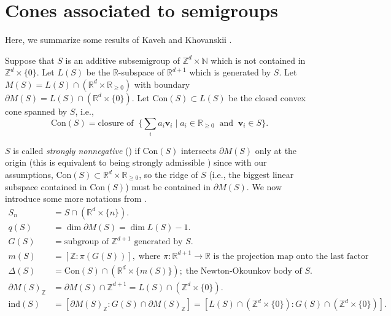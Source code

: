 \documentclass[12pt,a4paper]{amsart}
\theoremstyle{plain}
\theoremstyle{definition}
\numberwithin{equation}{theorem}
\begin{document}
\section{Cones associated to semigroups}\label{cones}

Here, we summarize some results of Kaveh and Khovanskii \cite{KK12}.

Suppose that $S$ is an additive subsemigroup of $\mathbb{Z}^d\times \mathbb{N}$ which is not contained in $\mathbb{Z}^d\times \{0\}$. Let $L(S)$ be the $\mathbb{R}$-subspace of $\mathbb{R}^{d+1}$ which is generated by $S$. Let $M(S) = L(S)\cap \left(\mathbb{R}^d\times \mathbb{R}_{\geq 0}\right)$ with boundary $\partial M(S) = L(S)\cap \left(\mathbb{R}^d\times \{0\}\right)$. Let $\mathrm{Con}(S) \subset L(S)$ be the closed convex cone spanned by $S$, i.e., $$\mathrm{Con}(S) = \text{closure of}\;\;\Big\{\sum_{i}a_i\mathbf{v}_i \mid a_i\in\mathbb{R}_{\geq 0}\;\;\text{and}\;\;\mathbf{v}_i\in S\Big\}.$$

$S$ is called \emph{strongly nonnegative} (\cite[Section 1.4]{KK12}) if $\mathrm{Con}(S)$ intersects $\partial M(S)$ only at the origin (this is equivalent to being strongly admissible \cite[Definition 1.9]{KK12}) since with our assumptions, $\mathrm{Con}(S) \subset \mathbb{R}^d\times \mathbb{R}_{\geq 0}$, so the ridge of $S$ (i.e., the biggest linear subspace contained in $\mathrm{Con}(S)$) must be contained in $\partial M(S)$. We now introduce some more notations from \cite[Section 1.4]{KK12}.
\begin{align*}
 S_n &= S \cap \left(\mathbb{R}^d\times \{n\}\right).\\
 q(S) &= \dim \partial M(S) = \dim L(S)-1.\\
 G(S) &= \text{subgroup of $\mathbb{Z}^{d+1}$ generated by $S$}.\\
 m(S) &= \left[\mathbb{Z} \colon \pi(G(S))\right],\;\text{where $\pi\colon \mathbb{R}^{d+1}\to \mathbb{R}$ is the projection map onto the last factor}\\
 \Delta(S) &= \mathrm{Con}(S)\cap \left(\mathbb{R}^d\times \{m(S)\}\right);\;\text{the Newton-Okounkov body of $S$}.\\
 \partial M(S)_{\mathbb{Z}} &= \partial M(S) \cap \mathbb{Z}^{d+1} = L(S)\cap \left(\mathbb{Z}^d\times \{0\}\right).\\
 \mathrm{ind}(S) &= \left[\partial M(S)_{\mathbb{Z}} \colon G(S)\cap \partial M(S)_{\mathbb{Z}}\right] = \left[L(S)\cap \left(\mathbb{Z}^d\times \{0\}\right) \colon G(S)\cap \left(\mathbb{Z}^d\times \{0\}\right)\right].
\end{align*}
\end{document}
